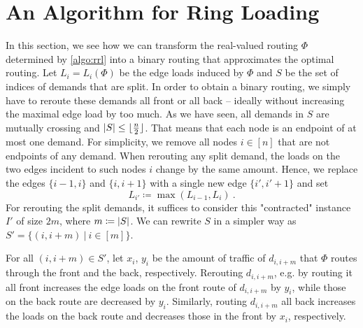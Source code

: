 \section{An Algorithm for Ring Loading}
\label{sec:ring-loading}

In this section, we see how we can transform the real-valued routing $\Phi$ determined by \cref{algo:rrl} into a binary routing that approximates the optimal routing.
Let $L_i = L_i(\Phi)$ be the edge loads induced by $\Phi$ and $S$ be the set of indices of demands that are split.
In order to obtain a binary routing, we simply have to reroute these demands all front or all back -- ideally without increasing the maximal edge load by too much. 
As we have seen, all demands in $S$ are mutually crossing and $\abs{S} \leq \lfloor \frac{n}{2} \rfloor$.
That means that each node is an endpoint of at most one demand.
For simplicity, we remove all nodes $i \in [n]$ that are not endpoints of any demand.
When rerouting any split demand, the loads on the two edges incident to such nodes $i$ change by the same amount.
Hence, we replace the edges $\{i-1, i\}$ and $\{i, i+1\}$ with a single new edge $\{i', i'+1\}$ and set 
\begin{equation}
	L_{i'} \coloneqq \max(L_{i-1}, L_i) \ .
\end{equation}
For rerouting the split demands, it suffices to consider this "contracted" instance $I'$ of size $2m$, where $m \coloneqq \abs{S}$.
We can rewrite $S$ in a simpler way as $S' = \{(i, i+m)\ |\ i \in [m]\}$.

For all $(i, i+m) \in S'$, let $x_i$, $y_i$ be the amount of traffic of $d_{i, i+m}$ that $\Phi$ routes through the front and the back, respectively.
Rerouting $d_{i, i+m}$, e.g. by routing it all front increases the edge loads on the front route of $d_{i, i+m}$ by $y_i$, while those on the back route are decreased by $y_i$.
Similarly, routing $d_{i, i+m}$ all back increases the loads on the back route and decreases those in the front by $x_i$, respectively.

